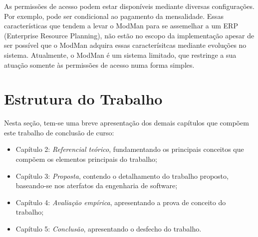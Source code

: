 As permissões de acesso podem estar disponíveis mediante diversas configurações. Por exemplo, pode ser condicional ao pagamento da mensalidade. Essas características que tendem a levar o ModMan para se assemelhar a um ERP (Enterprise Resource Planning), não estão no escopo da implementação apesar de ser possível que o ModMan adquira essas caracterísitcas mediante evoluções no sistema. Atualmente, o ModMan é um sistema limitado, que restringe a sua atuação somente às permissões de acesso numa forma simples.


\section{Estrutura do Trabalho}\label{estrutura} %


Nesta seção, tem-se uma breve apresentação dos demais capítulos que compõem este trabalho de conclusão de curso:

\begin{itemize}
    \item Capítulo 2: \textit{Referencial teórico}, fundamentando os principais conceitos que compõem os elementos principais do trabalho;
	\item Capítulo 3: \textit{Proposta}, contendo o detalhamento do trabalho proposto, baseando-se nos aterfatos da engenharia de software;
	\item Capítulo 4: \textit{Avaliação empírica}, apresentando a prova de conceito do trabalho;
	\item Capítulo 5: \textit{Conclusão}, apresentando o desfecho do trabalho.
\end{itemize}

